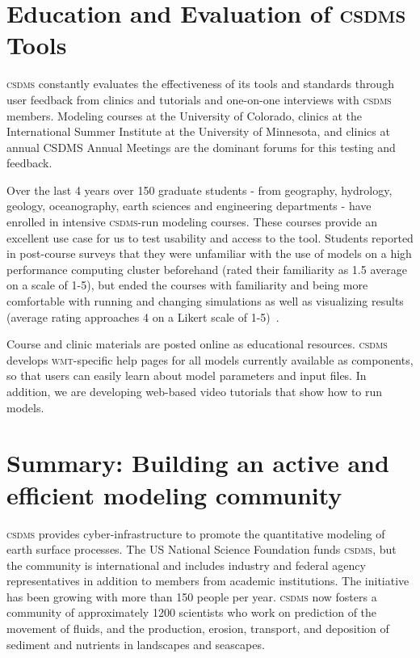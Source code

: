 \documentclass[11pt, oneside]{amsart}
\DeclareRobustCommand{\csdms}{\textsc{csdms}}
\DeclareRobustCommand{\wmt}{\textsc{wmt}}
\begin{document}
\section{Education and Evaluation of \csdms{} Tools}
\label{sec:education}


\csdms{} constantly evaluates the effectiveness of its tools and standards
through user feedback from clinics and tutorials and one-on-one interviews
with \csdms{} members.  Modeling courses at the University of Colorado,
clinics at the International Summer Institute at the University of Minnesota,
and clinics at annual CSDMS Annual Meetings are the dominant forums for
this testing and feedback. 

Over the last 4 years over 150 graduate students - from geography, hydrology,
geology, oceanography, earth sciences and engineering departments - have
enrolled in intensive \csdms{}-run modeling courses. These courses
provide an excellent use case for us to test usability and access to the
tool. Students reported in post-course surveys that they were unfamiliar with
the use of models on a high performance computing cluster beforehand (rated
their familiarity as 1.5 average on a scale of 1-5), but ended the courses
with familiarity and being more comfortable with running and changing
simulations as well as visualizing results (average rating approaches 4 on
a Likert scale of 1-5)~\cite{overeem2013strategies}. 

Course and clinic materials are posted online as educational resources.
\csdms{} develops \wmt{}-specific help pages for all models currently
available as components, so that users can easily learn about model
parameters and input files. In addition, we are developing web-based video
tutorials that show how to run models.

\section{Summary: Building an active and efficient modeling community}

\csdms{} provides cyber-infrastructure to promote the quantitative modeling of
earth surface processes. The US National Science Foundation funds \csdms{}, but
the community is international and includes industry and federal agency
representatives in addition to members from academic institutions. The
initiative has been growing with more than 150 people per year. \csdms{} now
fosters a community of approximately 1200 scientists who work on prediction
of the movement of fluids, and the production, erosion, transport, and
deposition of sediment and nutrients in landscapes and seascapes. 
\end{document}
